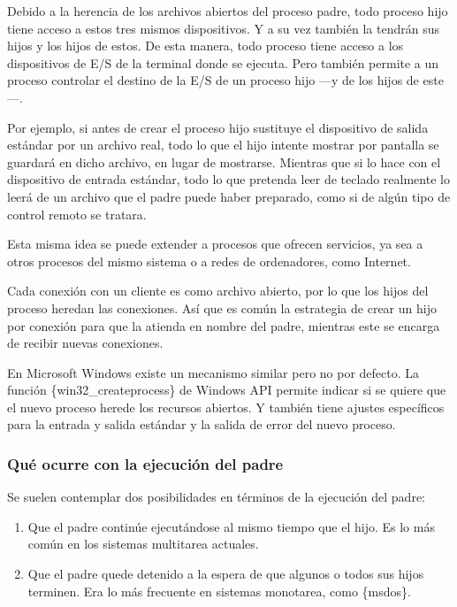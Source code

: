 Debido a la herencia de los archivos abiertos del proceso padre, todo
proceso hijo tiene acceso a estos tres mismos dispositivos. Y a su vez
también la tendrán sus hijos y los hijos de estos. De esta manera, todo
proceso tiene acceso a los dispositivos de E/S de la terminal donde se
ejecuta. Pero también permite a un proceso controlar el destino de la
E/S de un proceso hijo ---y de los hijos de este---.

Por ejemplo, si antes de crear el proceso hijo sustituye el dispositivo
de salida estándar por un archivo real, todo lo que el hijo intente
mostrar por pantalla se guardará en dicho archivo, en lugar de
mostrarse. Mientras que si lo hace con el dispositivo de entrada
estándar, todo lo que pretenda leer de teclado realmente lo leerá de un
archivo que el padre puede haber preparado, como si de algún tipo de
control remoto se tratara.

Esta misma idea se puede extender a procesos que ofrecen servicios, ya
sea a otros procesos del mismo sistema o a redes de ordenadores, como
Internet.

Cada conexión con un cliente es como archivo abierto, por lo que los
hijos del proceso heredan las conexiones. Así que es común la estrategia
de crear un hijo por conexión para que la atienda en nombre del padre,
mientras este se encarga de recibir nuevas conexiones.

En Microsoft Windows existe un mecanismo similar pero no por defecto. La
función \{win32\_createprocess\} de Windows API permite indicar si se
quiere que el nuevo proceso herede los recursos abiertos. Y también
tiene ajustes específicos para la entrada y salida estándar y la salida
de error del nuevo proceso.

\subsubsection{Qué ocurre con la ejecución del
padre}\label{_quuxe9_ocurre_con_la_ejecucion_del_padre}

Se suelen contemplar dos posibilidades en términos de la ejecución del
padre:

\begin{enumerate}
\def\labelenumi{\arabic{enumi}.}
\item
  Que el padre continúe ejecutándose al mismo tiempo que el hijo. Es lo
  más común en los sistemas multitarea actuales.
\item
  Que el padre quede detenido a la espera de que algunos o todos sus
  hijos terminen. Era lo más frecuente en sistemas monotarea, como
  \{msdos\}.
\end{enumerate}

